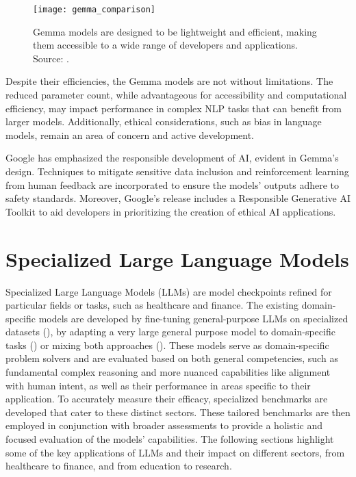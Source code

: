 \begin{figure}[ht!]
	\centering
	\texttt{[image: gemma\_comparison]}
	\caption{Gemma models are designed to be lightweight and efficient, making them accessible to a wide range of developers and applications. Source: \protect\textcite{gemma_google_ai}.}
	\label{fig:gemma-comparison}
\end{figure}

Despite their efficiencies, the Gemma models are not without limitations.
The reduced parameter count, while advantageous for accessibility and computational efficiency, may impact performance in complex NLP tasks that can benefit from larger models.
Additionally, ethical considerations, such as bias in language models, remain an area of concern and active development.

Google has emphasized the responsible development of AI, evident in Gemma's design.
Techniques to mitigate sensitive data inclusion and reinforcement learning from human feedback are incorporated to ensure the models' outputs adhere to safety standards.
Moreover, Google's release includes a Responsible Generative AI Toolkit to aid developers in prioritizing the creation of ethical AI applications.


\section{Specialized Large Language Models}
\label{sec:applications-of-large-language-models}

Specialized Large Language Models (LLMs) are model checkpoints refined for particular fields or tasks, such as healthcare and finance.
The existing domain-specific models are developed by fine-tuning general-purpose LLMs on specialized datasets (\textcite{luo2022biogpt,bolton2023biomedlm, taylor2022galactica}), by adapting a very large general purpose model to domain-specific tasks (\textcite{singhal2022large, liang2022holistic}) or mixing both approaches (\textcite{wu2023bloomberggpt}).
These models serve as domain-specific problem solvers and are evaluated based on both general competencies, such as fundamental complex reasoning and more nuanced capabilities like alignment with human intent, as well as their performance in areas specific to their application.
To accurately measure their efficacy, specialized benchmarks are developed that cater to these distinct sectors.
These tailored benchmarks are then employed in conjunction with broader assessments to provide a holistic and focused evaluation of the models' capabilities.
The following sections highlight some of the key applications of LLMs and their impact on different sectors, from healthcare to finance, and from education to research.

